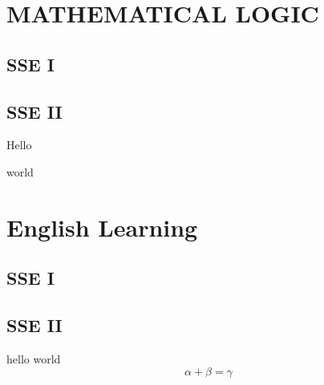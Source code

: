 \documentclass{book}
\begin{document}
\setcounter{chapter}{98}
\chapter{MATHEMATICAL LOGIC}
\section{SSE I}
\section{SSE II}
Hello \newpage

world

\setcounter{chapter}{0}
\chapter{English Learning}
\section{SSE I}
\section{SSE II}
hello world
\[
	\alpha + \beta = \gamma
\]
\end{document}
